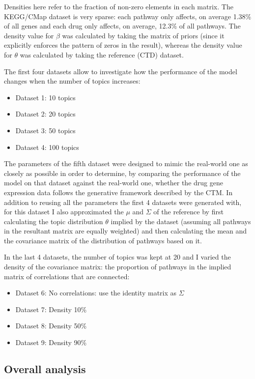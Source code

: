 \documentclass[12pt,a4paper,twoside,openright]{report}
\begin{document}
Densities here refer to the fraction of non-zero elements in each matrix. The KEGG/CMap dataset is very sparse: each pathway only affects, on average 1.38\% of all genes and each drug only affects, on average, 12.3\% of all pathways. The density value for $\beta$ was calculated by taking the matrix of priors (since it explicitly enforces the pattern of zeros in the result), whereas the density value for $\theta$ was calculated by taking the reference (CTD) dataset.

The first four datasets allow to investigate how the performance of the model changes when the number of topics increases:

\begin{itemize}[noitemsep]
\item Dataset 1: 10 topics
\item Dataset 2: 20 topics
\item Dataset 3: 50 topics
\item Dataset 4: 100 topics
\end{itemize}

The parameters of the fifth dataset were designed to mimic the real-world one as closely as possible in order to determine, by comparing the performance of the model on that dataset against the real-world one, whether the drug gene expression data follows the generative framework described by the CTM. In addition to reusing all the parameters the first 4 datasets were generated with, for this dataset I also approximated the $\mu$ and $\Sigma$ of the reference by first calculating the topic distribution $\theta$ implied by the dataset (assuming all pathways in the resultant matrix are equally weighted) and then calculating the mean and the covariance matrix of the distribution of pathways based on it.

In the last 4 datasets, the number of topics was kept at 20 and I varied the density of the covariance matrix: the proportion of pathways in the implied matrix of correlations that are connected:

\begin{itemize}[noitemsep]
\item Dataset 6: No correlations: use the identity matrix as $\Sigma$
\item Dataset 7: Density 10\%
\item Dataset 8: Density 50\%
\item Dataset 9: Density 90\%
\end{itemize}

\subsection{Overall analysis}
\end{document}
